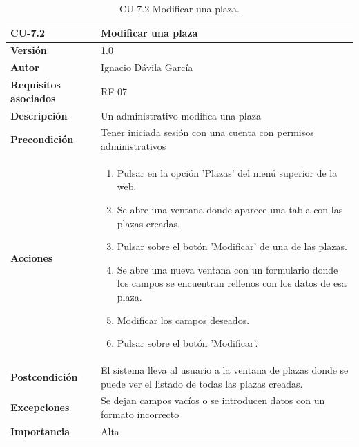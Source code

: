 \begin{table}[p]
	\centering
	\begin{tabularx}{\linewidth}{ p{} p{} }
		\toprule
		\textbf{CU-7.2}    & \textbf{Modificar una plaza}\\
		\toprule
		\textbf{Versión}              & 1.0    \\
		\textbf{Autor}                & Ignacio Dávila García \\
		\textbf{Requisitos asociados} & RF-07 \\
		\textbf{Descripción}          & Un administrativo modifica una plaza \\
		\textbf{Precondición}         & Tener iniciada sesión con una cuenta con permisos administrativos \\
		\textbf{Acciones}             &
		\begin{enumerate}
			\def\labelenumi{\arabic{enumi}.}
			\tightlist
			\item Pulsar en la opción 'Plazas' del menú superior de la web.
			\item Se abre una ventana donde aparece una tabla con las plazas creadas.
			\item Pulsar sobre el botón 'Modificar' de una de las plazas.
			\item Se abre una nueva ventana con un formulario donde los campos se encuentran rellenos con los datos de esa plaza.
			\item Modificar los campos deseados.
			\item Pulsar sobre el botón 'Modificar'.
		\end{enumerate}\\
		\textbf{Postcondición}        & El sistema lleva al usuario a la ventana de plazas donde se puede ver el listado de todas las plazas creadas. \\
		\textbf{Excepciones}          & Se dejan campos vacíos o se introducen datos con un formato incorrecto \\
		\textbf{Importancia}          & Alta \\
		\bottomrule
	\end{tabularx}
	\caption{CU-7.2 Modificar una plaza.}
\end{table}

